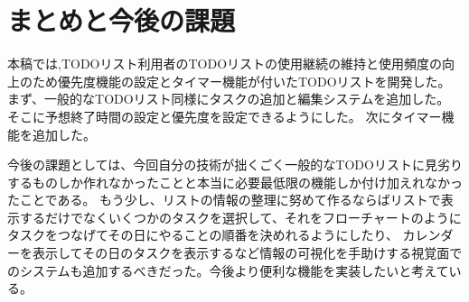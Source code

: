 \chapter{まとめと今後の課題}
\label{cha:conclusion}

 本稿では,TODOリスト利用者のTODOリストの使用継続の維持と使用頻度の向上のため優先度機能の設定とタイマー機能が付いたTODOリストを開発した。
 まず、一般的なTODOリスト同様にタスクの追加と編集システムを追加した。
 そこに予想終了時間の設定と優先度を設定できるようにした。
 次にタイマー機能を追加した。
 
 今後の課題としては、今回自分の技術が拙くごく一般的なTODOリストに見劣りするものしか作れなかったことと本当に必要最低限の機能しか付け加えれなかったことである。
もう少し、リストの情報の整理に努めて作るならばリストで表示するだけでなくいくつかのタスクを選択して、それをフローチャートのようにタスクをつなげてその日にやることの順番を決めれるようにしたり、
カレンダーを表示してその日のタスクを表示するなど情報の可視化を手助けする視覚面でのシステムも追加するべきだった。今後より便利な機能を実装したいと考えている。
